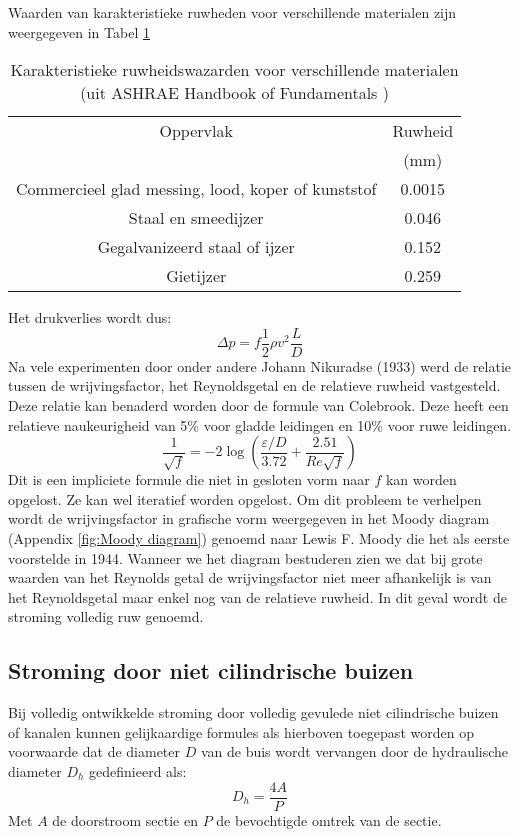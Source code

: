 \npar
Waarden van karakteristieke ruwheden voor verschillende materialen zijn weergegeven in Tabel \ref{tab:ruwheid van materialen}
\begin{table}
	\centering
	\begin{tabular}{cc}
		\hline
		Oppervlak & Ruwheid \\
		   & (mm) \\
		\hline
		Commercieel glad messing, lood, koper of kunststof & 0.0015 \\
		Staal en smeedijzer & 0.046 \\
		Gegalvanizeerd staal of ijzer & 0.152 \\
		Gietijzer & 0.259 \\
		\hline
	\end{tabular}
	\caption{Karakteristieke ruwheidswazarden voor verschillende materialen (uit ASHRAE Handbook of Fundamentals \cite{ASHRAE_Fundamentals})}
	\label{tab:ruwheid van materialen}
\end{table}
Het drukverlies wordt dus:
\begin{equation}
	\Delta p = f \frac{1}{2}\rho v^2 \frac{L}{D}
	\label{eqn:drukval bij turbulente stroming}
\end{equation}
\npar
Na vele experimenten door onder andere Johann Nikuradse (1933) werd de relatie tussen de wrijvingsfactor, het Reynoldsgetal en de relatieve ruwheid vastgesteld. Deze relatie kan benaderd worden door de formule van Colebrook. Deze heeft een relatieve naukeurigheid van 5\% voor gladde leidingen en 10\% voor ruwe leidingen.
\begin{equation}
	\frac{1}{\sqrt{f}} = -2 \log \left( \frac{\varepsilon/D}{3.72} + \frac{2.51}{Re \sqrt{f}} \right)
\end{equation}
Dit is een impliciete formule die niet in gesloten vorm naar $f$ kan worden opgelost. Ze kan wel iteratief worden opgelost.  Om dit probleem te verhelpen wordt de wrijvingsfactor in grafische vorm weergegeven in het Moody diagram (Appendix \ref{fig:Moody diagram}) genoemd naar Lewis F. Moody die het als eerste voorstelde in 1944.
\npar
Wanneer we het diagram bestuderen zien we dat bij grote waarden van het Reynolds getal de wrijvingsfactor niet meer afhankelijk is van het Reynoldsgetal maar enkel nog van de relatieve ruwheid. In dit geval wordt de stroming volledig ruw genoemd.

	\FloatBarrier
	\subsection{Stroming door niet cilindrische buizen}
Bij volledig ontwikkelde stroming door volledig gevulede niet cilindrische buizen of kanalen kunnen gelijkaardige formules als hierboven toegepast worden op voorwaarde dat de diameter $D$ van de buis wordt vervangen door de hydraulische diameter $D_h$ gedefinieerd als:
\begin{equation}
	D_h = \frac{4 A}{P}
\end{equation}
Met $A$ de doorstroom sectie en $P$ de bevochtigde omtrek van de sectie.
	


